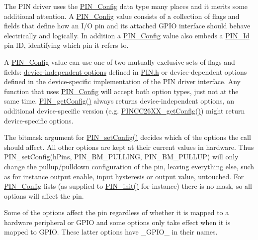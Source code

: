 The P\+I\+N driver uses the \hyperlink{_p_i_n_8h_ae427b7d2925f9b0f3145e455cfdb5841}{P\+I\+N\+\_\+\+Config} data type many places and it merits some additional attention. A \hyperlink{_p_i_n_8h_ae427b7d2925f9b0f3145e455cfdb5841}{P\+I\+N\+\_\+\+Config} value consists of a collection of flags and fields that define how an I/\+O pin and its attached G\+P\+I\+O interface should behave electrically and logically. In addition a \hyperlink{_p_i_n_8h_ae427b7d2925f9b0f3145e455cfdb5841}{P\+I\+N\+\_\+\+Config} value also embeds a \hyperlink{_p_i_n_8h_a9ae8197f460bb76ea09a84f47d09921f}{P\+I\+N\+\_\+\+Id} pin I\+D, identifying which pin it refers to.

A \hyperlink{_p_i_n_8h_ae427b7d2925f9b0f3145e455cfdb5841}{P\+I\+N\+\_\+\+Config} value can use one of two mutually exclusive sets of flags and fields\+: \hyperlink{_p_i_n_8h_PIN_GENERIC_FLAGS}{device-\/independent options} defined in \hyperlink{_p_i_n_8h}{P\+I\+N.\+h} or device-\/dependent options defined in the device-\/specific implementation of the P\+I\+N driver interface. Any function that uses \hyperlink{_p_i_n_8h_ae427b7d2925f9b0f3145e455cfdb5841}{P\+I\+N\+\_\+\+Config} will accept both option types, just not at the same time. \hyperlink{_p_i_n_8h_aed24cb96de8fa957e9f7c05dd239f2f9}{P\+I\+N\+\_\+get\+Config()} always returns device-\/independent options, an additional device-\/specific version (e.\+g. \hyperlink{_p_i_n_c_c26_x_x_8h_aef985455a19581bdb47fff4314fc318b}{P\+I\+N\+C\+C26\+X\+X\+\_\+get\+Config()}) might return device-\/specific options.

The bitmask argument for \hyperlink{_p_i_n_8h_a4b9fbd1a86e63d2f14f679b87f17c857}{P\+I\+N\+\_\+set\+Config()} decides which of the options the call should affect. All other options are kept at their current values in hardware. Thus P\+I\+N\+\_\+set\+Config(h\+Pins, P\+I\+N\+\_\+\+B\+M\+\_\+\+P\+U\+L\+L\+I\+N\+G, P\+I\+N\+\_\+\+B\+M\+\_\+\+P\+U\+L\+L\+U\+P) will only change the pullup/pulldown configuration of the pin, leaving everything else, such as for instance output enable, input hysteresis or output value, untouched. For \hyperlink{_p_i_n_8h_ae427b7d2925f9b0f3145e455cfdb5841}{P\+I\+N\+\_\+\+Config} lists (as supplied to \hyperlink{_p_i_n_8h_a0de1df98a14e6e13b16db414e54472ef}{P\+I\+N\+\_\+init()} for instance) there is no mask, so all options will affect the pin.

Some of the options affect the pin regardless of whether it is mapped to a hardware peripheral or G\+P\+I\+O and some options only take effect when it is mapped to G\+P\+I\+O. These latter options have \+\_\+\+G\+P\+I\+O\+\_\+ in their names.


